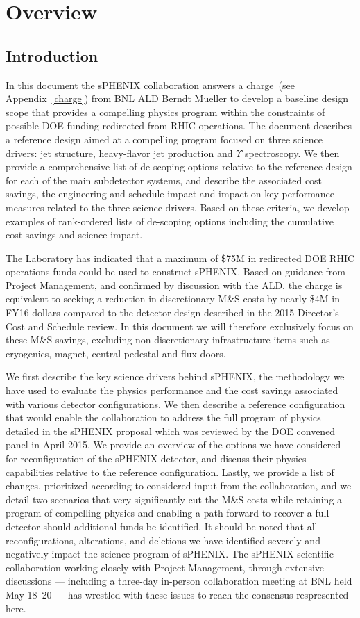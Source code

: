 \chapter{Overview}
\label{configurations}
\setcounter{page}{1}

\section{Introduction}
In this document the sPHENIX collaboration answers a charge~(see
Appendix~\ref{charge}) from BNL ALD Berndt Mueller to develop a
baseline design scope that provides a compelling physics program
within the constraints of possible DOE funding redirected from RHIC
operations. The document describes a reference design aimed at a
compelling program focused on three science drivers: jet structure,
heavy-flavor jet production and $\Upsilon$ spectroscopy. We then
provide a comprehensive list of de-scoping options relative to the
reference design for each of the main subdetector systems, and
describe the associated cost savings, the engineering and schedule
impact and impact on key performance measures related to the three
science drivers. Based on these criteria, we develop examples of
rank-ordered lists of de-scoping options including the cumulative
cost-savings and science impact.

The Laboratory has indicated that a maximum of \$75M in redirected DOE
RHIC operations funds could be used to construct sPHENIX.  Based on
guidance from Project Management, and confirmed by discussion with the ALD,
the charge is equivalent to seeking a reduction in discretionary M\&S
costs by nearly \$4M in FY16 dollars compared to the detector design
described in the 2015 Director's Cost and Schedule review.  In this
document we will therefore exclusively focus on these M\&S savings,
excluding non-discretionary infrastructure items such as cryogenics,
magnet, central pedestal and flux doors.

We first describe the key science drivers behind sPHENIX, the
methodology we have used to evaluate the physics performance and the
cost savings associated with various detector configurations.  We then
describe a reference configuration that would enable the collaboration
to address the full program of physics detailed in the sPHENIX
proposal which was reviewed by the DOE convened panel in April 2015.
We provide an overview of the options we have considered for
reconfiguration of the sPHENIX detector, and discuss their physics
capabilities relative to the reference configuration.  Lastly, we
provide a list of changes, prioritized according to considered input
from the collaboration, and we detail two scenarios that very
significantly cut the M\&S costs while retaining a program of
compelling physics and enabling a path forward to recover a full
detector should additional funds be identified.  It should be noted
that all reconfigurations, alterations, and deletions we have
identified severely and negatively impact the science program of
sPHENIX.  The sPHENIX scientific collaboration working closely with
Project Management, through extensive discussions --- including a
three-day in-person collaboration meeting at BNL held May 18--20 ---
has wrestled with these issues to reach the consensus respresented
here.
